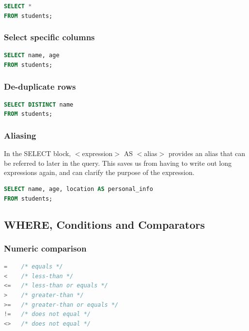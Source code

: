\documentclass{article}
\begin{document}
\vspace{8pt}
\begin{lstlisting}[language=SQL]
SELECT *
FROM students;
\end{lstlisting} \vspace{8pt}

\subsubsection{Select specific columns}
\vspace{8pt} \begin{lstlisting}[language=SQL]
SELECT name, age
FROM students;
\end{lstlisting} \vspace{8pt}

\subsubsection{De-duplicate rows}

\vspace{8pt} \begin{lstlisting}[language=SQL]
SELECT DISTINCT name
FROM students;
\end{lstlisting} \vspace{8pt}


\subsubsection{Aliasing}

In the SELECT block, $<$expression$>$ AS $<$alias$>$ provides an alias that can be referred to later in the query. This saves us from having to write out long expressions again, and can clarify the purpose of the expression.

\vspace{8pt} \begin{lstlisting}[language=SQL]
SELECT name, age, location AS personal_info
FROM students;
\end{lstlisting}


\subsection{WHERE, Conditions and Comparators}
\subsubsection{Numeric comparison}

\vspace{8pt} \begin{lstlisting}[language=SQL]
=    /* equals */
<    /* less-than */
<=   /* less-than or equals */
>    /* greater-than */
>=   /* greater-than or equals */
!=   /* does not equal */
<>   /* does not equal */
\end{lstlisting} \vspace{8pt}
\end{document}
